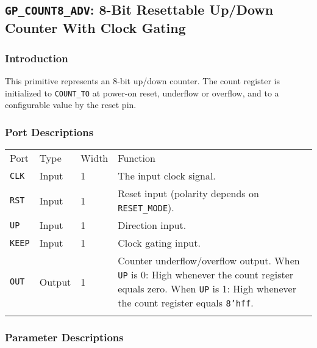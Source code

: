 \documentclass[11pt]{article}
\newcommand{\tokenstyle}[1]{\texttt{#1}}
\newcommand{\datastyle}[1]{\texttt{#1}}
\newcommand{\whenstyle}[1]{{\fontseries{sb}\selectfont#1}}
\newcommand{\thinhline}{\Xhline{1\arrayrulewidth}}
\newcommand{\thickhline}{\Xhline{2.5\arrayrulewidth}}
\begin{document}
\pagebreak
\subsection{\tokenstyle{GP\_COUNT8\_ADV}: 8-Bit Resettable Up/Down Counter With Clock Gating}
\label{gp-count8-adv}

\subsubsection{Introduction}
This primitive represents an 8-bit up/down counter. The count register is initialized to \tokenstyle{COUNT\_TO} at
power-on reset, underflow or overflow, and to a configurable value by the reset pin.

\subsubsection{Port Descriptions}

\begin{tabularx}{\textwidth}{lllX}
\thinhline
\whenstyle{Port} & \whenstyle{Type} & \whenstyle{Width} & \whenstyle{Function} \\
\thickhline
\tokenstyle{CLK} & Input & 1 & The input clock signal. \\
\thinhline
\tokenstyle{RST} & Input & 1 & Reset input (polarity depends on \tokenstyle{RESET\_MODE}). \\
\thinhline
\tokenstyle{UP} & Input & 1 & Direction input. \\
\thinhline
\tokenstyle{KEEP} & Input & 1 & Clock gating input. \\
\thinhline
\tokenstyle{OUT} & Output & 1 & Counter underflow/overflow output. \newline
	\whenstyle{When \tokenstyle{UP} is 0:} High whenever the count register equals zero. \newline
	\whenstyle{When \tokenstyle{UP} is 1:} High whenever the count register equals \datastyle{8'hff}. \\
\thinhline
\end{tabularx}

\subsubsection{Parameter Descriptions}
\end{document}
